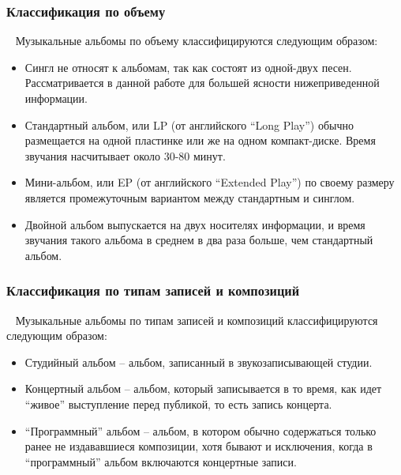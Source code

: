 \subsubsection{Классификация по объему}
\label{sub:domain:music_album:volume_classification}
~\newline
\indent Музыкальные альбомы по объему классифицируются следующим образом:
\begin{itemize}
  \item Сингл не относят к альбомам, так как состоят из одной-двух песен. Рассматривается в данной работе для большей ясности нижеприведенной информации.
  \item Стандартный альбом, или LP (от английского “Long Play”) обычно размещается на одной пластинке или же на одном компакт-диске. Время звучания насчитывает около 30-80 минут.
  \item Мини-альбом, или EP (от английского “Extended Play”) по своему размеру является промежуточным вариантом между стандартным и синглом.
  \item Двойной альбом выпускается на двух носителях информации, и время звучания такого альбома в среднем в два раза больше, чем стандартный альбом.
\end{itemize}

\subsubsection{Классификация по типам записей и композиций}
\label{sub:domain:music_album:records_type_classification}
~\newline
\indent Музыкальные альбомы по типам записей и композиций классифицируются следующим образом:
\begin{itemize}
  \item Студийный альбом -- альбом, записанный в звукозаписывающей студии.
  \item Концертный альбом -- альбом, который записывается в то время, как идет “живое” выступление перед публикой, то есть запись концерта.
  \item “Программный” альбом -- альбом, в котором обычно содержаться только ранее не издававшиеся композиции, хотя бывают и исключения, когда в “программный” альбом включаются концертные записи.
\end{itemize}

